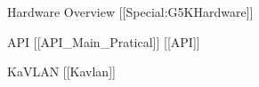 \documentclass[final]{beamer}
\newlength{\sepwid}
\newlength{\twocolwid}
\newlength{\threecolwid}
\begin{document}
\begin{frame}[t]
\begin{columns}[t]
\begin{column}{\twocolwid} %



\begin{alertblock}{Hardware Overview [[Special:G5KHardware]]}

\end{alertblock}



\begin{alertblock}{API [[API\_Main\_Pratical]] [[API]]}

\end{alertblock}



\begin{alertblock}{KaVLAN [[Kavlan]]}

\end{alertblock}


\end{column} %

\begin{column}{\sepwid}\end{column} %

\begin{column}{\threecolwid} %



\end{column}
\end{columns}
\end{frame}
\end{document}
